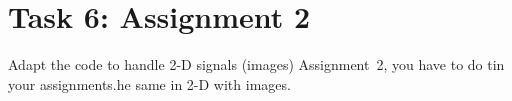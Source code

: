 \documentclass[english,a4paper,12pt,oneside]{article}
\begin{document}
%
%
%
%
%
%
%
%
%
%


\section*{Task 6: Assignment 2}

Adapt the code to handle 2-D signals  (images) 
 Assignment~2, you have to do tin your assignments.he same in 2-D with images. 
 
\end{document}
